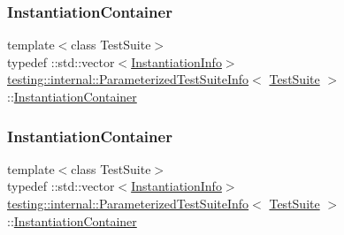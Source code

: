 \subsubsection{\texorpdfstring{InstantiationContainer}{InstantiationContainer}\hspace{0.1cm}{\footnotesize\ttfamily [1/2]}}
{\footnotesize\ttfamily template$<$class Test\+Suite$>$ \\
typedef \+::std\+::vector$<$\mbox{\hyperlink{structtesting_1_1internal_1_1_parameterized_test_suite_info_1_1_instantiation_info}{Instantiation\+Info}}$>$ \mbox{\hyperlink{classtesting_1_1internal_1_1_parameterized_test_suite_info}{testing\+::internal\+::\+Parameterized\+Test\+Suite\+Info}}$<$ \mbox{\hyperlink{classtesting_1_1_test_suite}{Test\+Suite}} $>$\+::\mbox{\hyperlink{classtesting_1_1internal_1_1_parameterized_test_suite_info_a65cee35a4b9653272b6017640816eb68}{Instantiation\+Container}}\hspace{0.3cm}{\ttfamily [private]}}

\mbox{\label{classtesting_1_1internal_1_1_parameterized_test_suite_info_a65cee35a4b9653272b6017640816eb68}} 
\subsubsection{\texorpdfstring{InstantiationContainer}{InstantiationContainer}\hspace{0.1cm}{\footnotesize\ttfamily [2/2]}}
{\footnotesize\ttfamily template$<$class Test\+Suite$>$ \\
typedef \+::std\+::vector$<$\mbox{\hyperlink{structtesting_1_1internal_1_1_parameterized_test_suite_info_1_1_instantiation_info}{Instantiation\+Info}}$>$ \mbox{\hyperlink{classtesting_1_1internal_1_1_parameterized_test_suite_info}{testing\+::internal\+::\+Parameterized\+Test\+Suite\+Info}}$<$ \mbox{\hyperlink{classtesting_1_1_test_suite}{Test\+Suite}} $>$\+::\mbox{\hyperlink{classtesting_1_1internal_1_1_parameterized_test_suite_info_a65cee35a4b9653272b6017640816eb68}{Instantiation\+Container}}\hspace{0.3cm}{\ttfamily [private]}}

